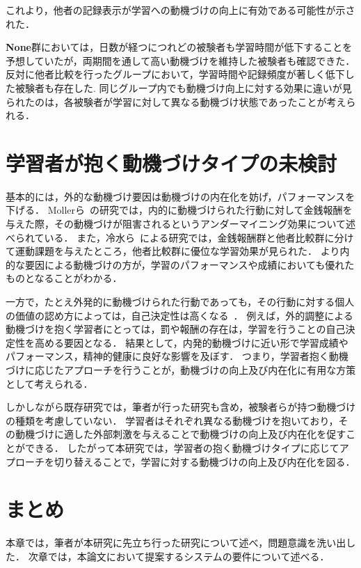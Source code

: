 これより，他者の記録表示が学習への動機づけの向上に有効である可能性が示された．

{\bf None}群においては，日数が経つにつれどの被験者も学習時間が低下することを予想していたが，両期間を通して高い動機づけを維持した被験者も確認できた．
反対に他者比較を行ったグループにおいて，学習時間や記録頻度が著しく低下した被験者も存在した.
同じグループ内でも動機づけ向上に対する効果に違いが見られたのは，各被験者が学習に対して異なる動機づけ状態であったことが考えられる．

\section{学習者が抱く動機づけタイプの未検討}
基本的には，外的な動機づけ要因は動機づけの内在化を妨げ，パフォーマンスを下げる．
Mollerら~\cite{moller2006self}の研究では，内的に動機づけられた行動に対して金銭報酬を与えた際，その動機づけが阻害されるというアンダーマイニング効果について述べられている．
また，冷水ら~\cite{shimizu}による研究では，金銭報酬群と他者比較群に分けて運動課題を与えたところ，他者比較群に優位な学習効果が見られた．
より内的な要因による動機づけの方が，学習のパフォーマンスや成績においても優れたものとなることがわかる．

一方で，たとえ外発的に動機づけられた行動であっても，その行動に対する個人の価値の認め方によっては，自己決定性は高くなる~\cite{ryan2000self}．
例えば，外的調整による動機づけを抱く学習者にとっては，罰や報酬の存在は，学習を行うことの自己決定性を高める要因となる．
結果として，内発的動機づけに近い形で学習成績やパフォーマンス，精神的健康に良好な影響を及ぼす．
つまり，学習者抱く動機づけに応じたアプローチを行うことが，動機づけの向上及び内在化に有用な方策として考えられる．

しかしながら既存研究では，筆者が行った研究も含め，被験者らが持つ動機づけの種類を考慮していない．
学習者はそれぞれ異なる動機づけを抱いており，その動機づけに適した外部刺激を与えることで動機づけの向上及び内在化を促すことができる．
したがって本研究では，学習者の抱く動機づけタイプに応じてアプローチを切り替えることで，学習に対する動機づけの向上及び内在化を図る．

\section{まとめ}
本章では，筆者が本研究に先立ち行った研究について述べ，問題意識を洗い出した．
次章では，本論文において提案するシステムの要件について述べる．